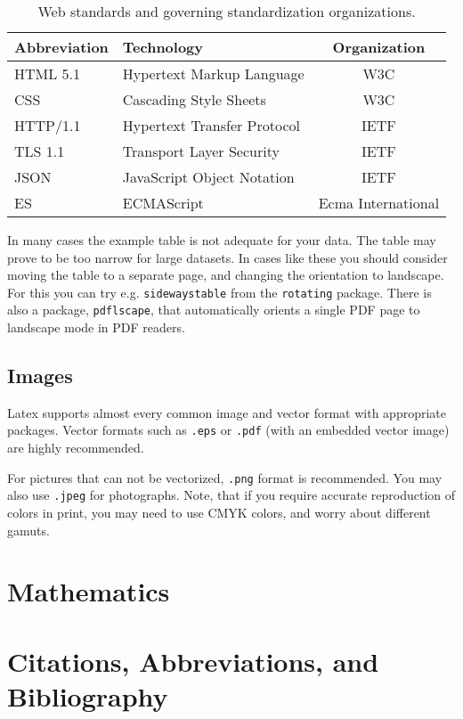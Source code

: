 \documentclass[english]{jamk-report}
\begin{document}
\begin{table}[h]\centering
{}
    \begin{tabularx}{\textwidth-1em}{llc} \toprule
        Abbreviation & Technology & Organization  \\ \midrule
        HTML 5.1 & Hypertext Markup Language & W3C \\
        CSS  & Cascading Style Sheets & W3C  \\
        HTTP/1.1& Hypertext Transfer Protocol &  IETF \\
        TLS 1.1 & Transport Layer Security & IETF \\
        JSON & JavaScript Object Notation & IETF \\
        ES & ECMAScript & Ecma International \\
        \bottomrule
    \end{tabularx}
\caption{Web standards and governing standardization organizations.}
\label{table:web}
\end{table}

\noindent
In many cases the example table is not adequate for your data. The table
may prove to be too narrow for large datasets. In cases like these you
should consider moving the table to a separate page, and changing the
orientation to landscape. For this you can try e.g. \texttt{sidewaystable} 
from the \texttt{rotating} package. There is also a package, \texttt{pdflscape}, that automatically
orients a single PDF page to landscape mode in PDF readers.


\subsection{Images}

Latex supports almost every common image and vector format with appropriate 
packages. Vector formats such as \texttt{.eps} or \texttt{.pdf} (with an embedded vector image)
are highly recommended.

For pictures that can not be vectorized, \texttt{.png} format is recommended. You
may also use \texttt{.jpeg} for photographs. Note, that if you require accurate
reproduction of colors in print, you may need to use CMYK colors, and worry about different gamuts.

\section{Mathematics}

\section{Citations, Abbreviations, and Bibliography}
\end{document}
